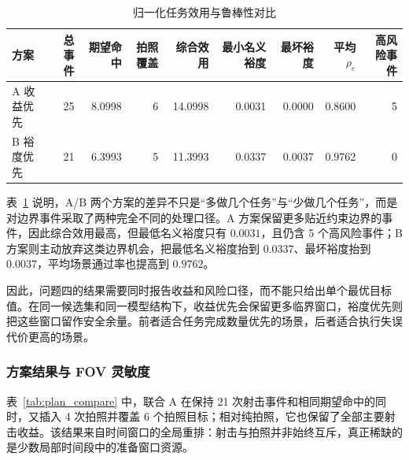 \documentclass{cumcmthesis}
\begin{document}
\begin{table}[H]
  \centering
  \caption{归一化任务效用与鲁棒性对比}
  \label{tab:ab_robust_compare}
  \small
  \begin{tabular}{lrrrrrrrr}
    \toprule
    方案 & 总事件 & 期望命中 & 拍照覆盖 & 综合效用 & 最小名义裕度 & 最坏裕度 & 平均$\rho_e$ & 高风险事件\\
    \midrule
    A 收益优先 & 25 & 8.0998 & 6 & 14.0998 & 0.0031 & 0.0000 & 0.8600 & 5\\
    B 裕度优先 & 21 & 6.3993 & 5 & 11.3993 & 0.0337 & 0.0037 & 0.9762 & 0\\
    \bottomrule
  \end{tabular}
\end{table}
表~\ref{tab:ab_robust_compare} 说明，A/B 两个方案的差异不只是“多做几个任务”与“少做几个任务”，而是对边界事件采取了两种完全不同的处理口径。A 方案保留更多贴近约束边界的事件，因此综合效用最高，但最低名义裕度只有 $0.0031$，且仍含 5 个高风险事件；B 方案则主动放弃这类边界机会，把最低名义裕度抬到 $0.0337$、最坏裕度抬到 $0.0037$，平均场景通过率也提高到 $0.9762$。

因此，问题四的结果需要同时报告收益和风险口径，而不能只给出单个最优目标值。在同一候选集和同一模型结构下，收益优先会保留更多临界窗口，裕度优先则把这些窗口留作安全余量。前者适合任务完成数量优先的场景，后者适合执行失误代价更高的场景。

\subsubsection{方案结果与 FOV 灵敏度}
\begin{table}[H]
  \centering
  \caption{纯射击、纯拍照与联合方案比较}
  \label{tab:plan_compare}
  \footnotesize
  \setlength{\tabcolsep}{2pt}
\end{table}
表~\ref{tab:plan_compare} 中，联合 A 在保持 21 次射击事件和相同期望命中的同时，又插入 4 次拍照并覆盖 6 个拍照目标；相对纯拍照，它也保留了全部主要射击收益。该结果来自时间窗口的全局重排：射击与拍照并非始终互斥，真正稀缺的是少数局部时间段中的准备窗口资源。
\end{document}
